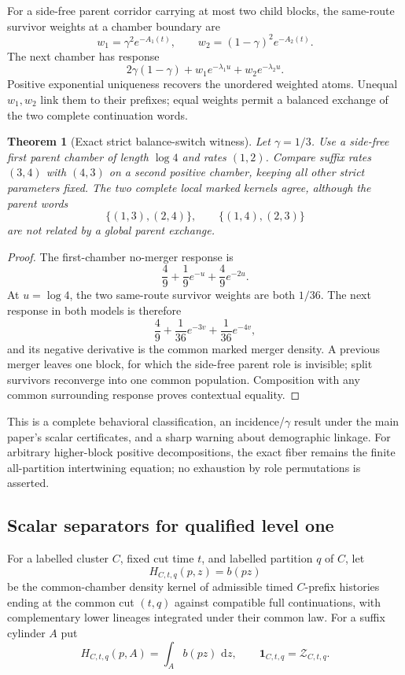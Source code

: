 \documentclass[11pt]{article}
\newtheorem{theorem}{Theorem}[section]
\newcommand{\dd}{\,\mathrm d}
\newcommand{\one}{\mathbf 1}
\begin{document}
For a side-free parent corridor carrying at most two child blocks, the same-route survivor weights at a chamber boundary are
\[
w_1=\gamma^2e^{-A_1(t)},\qquad
w_2=(1-\gamma)^2e^{-A_2(t)}.
\]
The next chamber has response
\[
2\gamma(1-\gamma)+w_1e^{-\lambda_1u}+w_2e^{-\lambda_2u}.
\]
Positive exponential uniqueness recovers the unordered weighted atoms.  Unequal $w_1,w_2$ link them to their prefixes; equal weights permit a balanced exchange of the two complete continuation words.

\begin{theorem}[Exact strict balance-switch witness]
Let $\gamma=1/3$.  Use a side-free first parent chamber of length $\log4$ and rates $(1,2)$.  Compare suffix rates $(3,4)$ with $(4,3)$ on a second positive chamber, keeping all other strict parameters fixed.  The two complete local marked kernels agree, although the parent words
\[
\{(1,3),(2,4)\},\qquad \{(1,4),(2,3)\}
\]
are not related by a global parent exchange.
\end{theorem}

\begin{proof}
The first-chamber no-merger response is
\[
\frac49+\frac19e^{-u}+\frac49e^{-2u}.
\]
At $u=\log4$, the two same-route survivor weights are both $1/36$.  The next response in both models is therefore
\[
\frac49+\frac1{36}e^{-3v}+\frac1{36}e^{-4v},
\]
and its negative derivative is the common marked merger density.  A previous merger leaves one block, for which the side-free parent role is invisible; split survivors reconverge into one common population.  Composition with any common surrounding response proves contextual equality.
\end{proof}

This is a complete behavioral classification, an incidence/$\gamma$ result under the main paper's scalar certificates, and a sharp warning about demographic linkage.  For arbitrary higher-block positive decompositions, the exact fiber remains the finite all-partition intertwining equation; no exhaustion by role permutations is asserted.

\subsection{Scalar separators for qualified level one}

For a labelled cluster $C$, fixed cut time $t$, and labelled partition $q$ of $C$, let
\[
H_{C,t,q}(p,z)=b(pz)
\]
be the common-chamber density kernel of admissible timed $C$-prefix histories ending at the common cut $(t,q)$ against compatible full continuations, with complementary lower lineages integrated under their common law.  For a suffix cylinder $A$ put
\[
H_{C,t,q}(p,A)=\int_A b(pz)\,\dd z,
\qquad
\one_{C,t,q}=\mathcal Z_{C,t,q}.
\]
\end{document}

